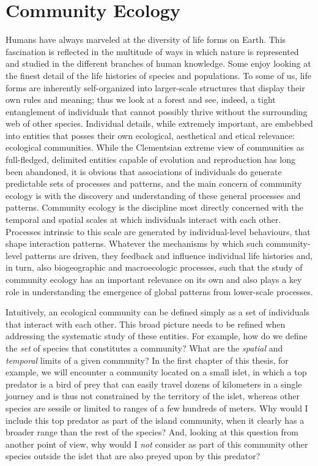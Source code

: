 \section{Community Ecology}

Humans have always marveled at the diversity of life forms on Earth. This fascination is reflected in the multitude of ways in which nature is represented and studied in the different branches of human knowledge. Some enjoy looking at the finest detail of the life histories of species and populations. To some of us, life forms are inherently self-organized into larger-scale structures that display their own rules and meaning; thus we look at a forest and see, indeed, a tight entanglement of individuals that cannot possibly thrive without the surrounding web of other species. Individual details, while extremely important, are embebbed into entities that posses their own ecological, aesthetical and etical relevance: ecological communities. While the Clementsian extreme view of communities as full-fledged, delimited entities capable of evolution and reproduction has long been abandoned, it is obvious that associations of individuals do generate predictable sets of processes and patterns, and the main concern of community ecology is with the discovery and understanding of these general processes and patterns. Community ecology is the discipline most directly concerned with the temporal and spatial scales at which individuals interact with each other. Processes intrinsic to this scale are generated by individual-level behaviours, that shape interaction patterns. Whatever the mechanisms by which such community-level patterns are driven, they feedback and influence individual life histories and, in turn, also biogeographic and macroecologic processes, such that the study of community ecology has an important relevance on its own and also plays a key role in understanding the emergence of global patterns from lower-scale processes.

Intuitively, an ecological community can be defined simply as a set of individuals that interact with each other. This broad picture needs to be refined when addressing the systematic study of these entities. For example, how do we define the \textit{set} of species that constitutes a community? What are the \textit{spatial} and \textit{temporal} limits of a given community? In the first chapter of this thesis, for example, we will encounter a community located on a small islet, in which a top predator is a bird of prey that can easily travel dozens of kilometers in a single journey and is thus not constrained by the territory of the islet, whereas other species are sessile or limited to ranges of a few hundreds of meters. Why would I include this top predator as part of the island community, when it clearly has a broader range than the rest of the species? And, looking at this question from another point of view, why would I \textit{not} consider as part of this community other species outside the islet that are also preyed upon by this predator?

